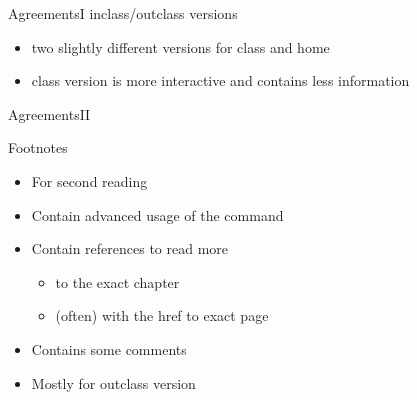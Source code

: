 \begin{frame}{Agreements}{I}\relax
     {\Large inclass/outclass versions}
     \begin{itemize}
          \item two slightly different versions for class and home
          \item class version is more interactive and contains less information
     \end{itemize}
\end{frame}

{\supressfootnotefalse
\begin{frame}[fragile]{Agreements}{II}\relax
\newcommand{\tikzmark}[1]{\tikz[overlay,remember picture] \node (#1) {};}

{ \Large Footnotes }

\begin{itemize}
     \item For second reading
     \item Contain advanced usage of the command 
     \item Contain references to read more 
     \begin{itemize}
         \item to the exact chapter 
         \item (often) with the href to exact page  
     \end{itemize}
     \item Contains some comments
     \item Mostly for outclass version
\end{itemize}
\end{frame}

}

